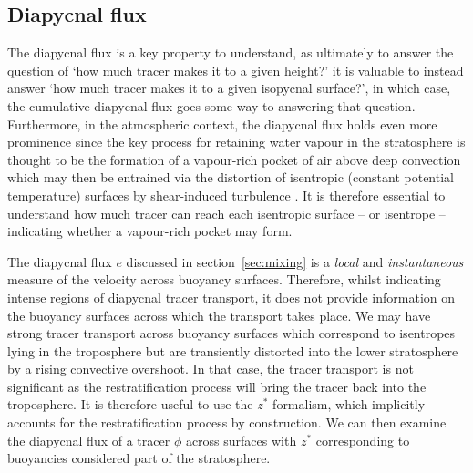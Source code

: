\documentclass[a4paper]{article}
\begin{document}
\subsection{Diapycnal flux}

\label{sec:diapyc}
The diapycnal flux is a key property to understand, as ultimately to answer the question of `how much tracer
makes it to a given height?' it is valuable to instead answer `how much tracer makes it to a given isopycnal
surface?', in which case, the cumulative diapycnal flux goes some way to answering that question. Furthermore,
in the atmospheric context, the diapycnal flux holds even more prominence since the key process for retaining
water vapour in the stratosphere is thought to be the formation of a vapour-rich pocket of air above deep
convection which may then be entrained via the distortion of isentropic (constant potential temperature)
surfaces by shear-induced turbulence \citep{dauhut2018}. It is therefore essential to understand how much
tracer can reach each isentropic surface -- or isentrope -- indicating whether a vapour-rich pocket may form.

The diapycnal flux $e$ discussed in section~\ref{sec:mixing} is a \emph{local} and \emph{instantaneous}
measure of the velocity across buoyancy surfaces. Therefore, whilst indicating intense regions of diapycnal
tracer transport, it does not provide information on the buoyancy surfaces across which the transport takes
place. We may have strong tracer transport across buoyancy surfaces which correspond to isentropes lying in
the troposphere but are transiently distorted into the lower stratosphere by a rising convective overshoot. In
that case, the tracer transport is not significant as the restratification process will bring the tracer back
into the troposphere. It is therefore useful to use the $z^*$ formalism, which implicitly accounts for the
restratification process by construction. We can then examine the diapycnal flux of a tracer $\phi$ across
surfaces with $z^*$ corresponding to buoyancies considered part of the stratosphere.
\end{document}
